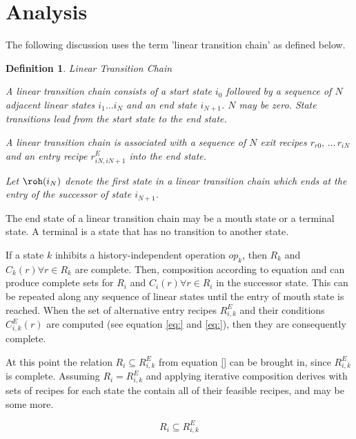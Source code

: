\documentclass[12pt,a4paper]{scrartcl}
\newtheorem{definition}{Definition}
\begin{document}
\section{Analysis}

The following discussion uses the term 'linear transition chain' as defined
below.

\begin{definition} Linear Transition Chain

    A linear transition chain consists of a start state $i_0$ followed by a
    sequence of $N$ adjacent linear states $i_1 \ldots i_{N}$ and an end state
    $i_{N+1}$. $N$ may be zero. State transitions lead from the start state to
    the end state. 
    
    A linear transition chain is associated with a sequence of $N$ exit recipes
    $r_{r0},\,\ldots\,r_{iN}$ and an entry recipe $r^E_{iN,iN+1}$ into the end
    state.

    Let $\roh(i_N)$ denote the first state in a linear transition chain which ends
    at the entry of the successor of state $i_{N+1}$.
    
\end{definition}

The end state of a linear transition chain may be a mouth state or a terminal
state. A terminal is a state that has no transition to another state. 


If a state $k$ inhibits a history-independent operation $op_k$, then $R_k$ and
$C_k(r) \forall r\in R_k$ are complete. Then, composition according to equation
\label{eq:composition-complete-recipe} and
\label{eq:composition-complete-condition} can produce complete sets for $R_i$
and $C_i(r) \forall r\in R_i$ in the successor state. This can be repeated
along any sequence of linear states until the entry of mouth state is reached.
When the set of alternative entry recipes $R^E_{i,k}$ and their conditions
$C^E_{i,k}(r)$ are computed (see equation \ref{eq:} and \ref{eq:}), then they
are consequently complete.

At this point the relation $R_i \subseteq R^E_{i,k}$ from equation \eqref{} can
be brought in, since $R^E_{i,k}$ is complete. Assuming $R_i = R^E_{i,k}$ and
applying iterative composition derives with sets of recipes for each state the
contain all of their feasible recipes, and may be some more.

\begin{equation} \label{eq:pr-subset-junction}
    R_i \subseteq R^E_{i,k} 
\end{equation}
\end{document}

